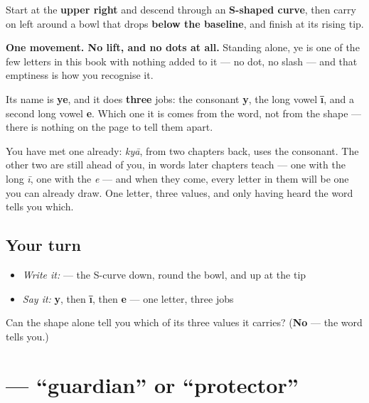 \begin{quote}
\end{quote}

Start at the \textbf{upper right} and descend through an \textbf{S-shaped curve}, then carry on left around a bowl that drops \textbf{below the baseline}, and finish at its rising tip.

\textbf{One movement. No lift, and no dots at all.} Standing alone, ye is one of the few letters in this book with nothing added to it — no dot, no slash — and that emptiness is how you recognise it.

Its name is \textbf{ye}, and it does \textbf{three} jobs: the consonant \textbf{y}, the long vowel \textbf{ī}, and a second long vowel \textbf{e}. Which one it is comes from the word, not from the shape — there is nothing on the page to tell them apart.

You have met one already: \textbf{} \emph{kyā}, from two chapters back, uses the consonant. The other two are still ahead of you, in words later chapters teach — one with the long \emph{ī}, one with the \emph{e} — and when they come, every letter in them will be one you can already draw. One letter, three values, and only having heard the word tells you which.

\subsection*{Your turn}
\begin{itemize}
\raggedright
  \item \emph{Write it:}  — the S-curve down, round the bowl, and up at the tip
  \item \emph{Say it:} \textbf{y}, then \textbf{ī}, then \textbf{e} — one letter, three jobs
\end{itemize}

\begin{tcolorbox}[breakable,colback=teal!4,colframe=teal!35!black,title={Before you move on}]
Can the shape alone tell you which of its three values it carries? (\textbf{No} — the word tells you.)
\end{tcolorbox}
\section[\texorpdfstring{\ur{حافظ} (hāfiz)}{حافظ (hāfiz)}]{ — “guardian” or “protector”}

\label{lesson:UR-C05-hafiz}



